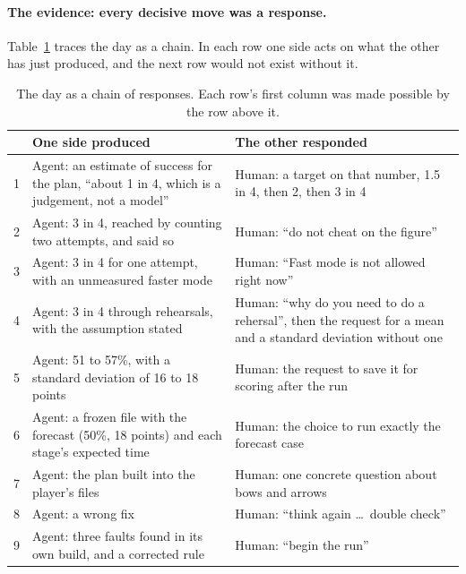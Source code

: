 \documentclass[11pt,a4paper]{article}
\begin{document}
\paragraph{The evidence: every decisive move was a response.} Table~\ref{tab:chain} traces the day as a chain. In each row one side acts on what the other has just produced, and the next row would not exist without it.

\begin{table}[!tbp]
\caption{The day as a chain of responses. Each row's first column was made possible by the row above it.}
\label{tab:chain}
\small
\begin{tabularx}{\textwidth}{@{}l>{\raggedright\arraybackslash}X>{\raggedright\arraybackslash}X@{}}
\toprule
 & One side produced & The other responded \\
\midrule
1 & Agent: an estimate of success for the plan, ``about 1 in 4, which is a judgement, not a model'' & Human: a target on that number, 1.5 in 4, then 2, then 3 in 4 \\
2 & Agent: 3 in 4, reached by counting two attempts, and said so & Human: ``do not cheat on the figure'' \\
3 & Agent: 3 in 4 for one attempt, with an unmeasured faster mode & Human: ``Fast mode is not allowed right now'' \\
4 & Agent: 3 in 4 through rehearsals, with the assumption stated & Human: ``why do you need to do a rehersal'', then the request for a mean and a standard deviation without one \\
5 & Agent: 51 to 57\%, with a standard deviation of 16 to 18 points & Human: the request to save it for scoring after the run \\
6 & Agent: a frozen file with the forecast (50\%, 18 points) and each stage's expected time & Human: the choice to run exactly the forecast case \\
7 & Agent: the plan built into the player's files & Human: one concrete question about bows and arrows \\
8 & Agent: a wrong fix & Human: ``think again \ldots\ double check'' \\
9 & Agent: three faults found in its own build, and a corrected rule & Human: ``begin the run'' \\
\bottomrule
\end{tabularx}
\end{table}
\end{document}
